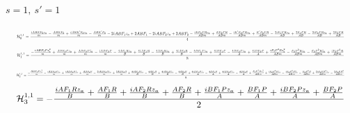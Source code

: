 \documentclass[10pt]{article}
\begin{document}
\paragraph{$s=1,\ s'=1$}
\begin{equation*}
\resizebox{0.98\textwidth}{!}{${\displaystyle \mathcal H^{1,1}_0=\frac{\frac{i A B E F_2 z_a}{m} - \frac{A B E F_2}{m} + \frac{i A B E' F_2 z_a}{m} - \frac{A B E' F_2}{m} - 2 i A B F_1 z_a + 2 A B F_1 - 2 i A B F_2 z_a + 2 A B F_2 - \frac{i E F_2 P R z_a}{A B m} + \frac{E F_2 P R}{A B m} - \frac{i E' F_2 P R z_a}{A B m} + \frac{E' F_2 P R}{A B m} - \frac{2 i F_1 P R z_a}{A B} + \frac{2 F_1 P R}{A B} - \frac{2 i F_2 P R z_a}{A B} + \frac{2 F_2 P R}{A B}}{4}}$}
\end{equation*}
\begin{equation*}
\resizebox{0.98\textwidth}{!}{${\displaystyle \mathcal H^{1,1}_1=\frac{- \frac{i A B F_2 P z_a^{2}}{m} + \frac{A B F_2 P z_a}{m} + \frac{A B F_2 P \bar z_a}{m} - \frac{i A B F_2 P}{m} - \frac{4 A F_1 R z_a}{B} + \frac{4 i A F_1 R}{B} - \frac{4 A F_2 R z_a}{B} + \frac{4 i A F_2 R}{B} - \frac{4 B F_1 P z_a}{A} + \frac{4 i B F_1 P}{A} - \frac{4 B F_2 P z_a}{A} + \frac{4 i B F_2 P}{A} + \frac{i F_2 P^{2} R z_a^{2}}{A B m} - \frac{F_2 P^{2} R z_a}{A B m} - \frac{F_2 P^{2} R \bar z_a}{A B m} + \frac{i F_2 P^{2} R}{A B m}}{8}}$}
\end{equation*}
\begin{equation*}
\resizebox{0.98\textwidth}{!}{${\displaystyle \mathcal H^{1,1}_2=\frac{- \frac{A B F_2 P z_a^{2}}{m} - \frac{i A B F_2 P z_a}{m} + \frac{i A B F_2 P \bar z_a}{m} + \frac{A B F_2 P}{m} - \frac{2 i A B F_2 R z_a}{m} + \frac{2 A B F_2 R}{m} + \frac{4 i A F_1 R z_a}{B} - \frac{4 A F_1 R}{B} + \frac{4 i A F_2 R z_a}{B} - \frac{4 A F_2 R}{B} + \frac{4 i B F_1 P z_a}{A} - \frac{4 B F_1 P}{A} + \frac{4 i B F_2 P z_a}{A} - \frac{4 B F_2 P}{A} + \frac{F_2 P^{2} R z_a^{2}}{A B m} + \frac{i F_2 P^{2} R z_a}{A B m} - \frac{i F_2 P^{2} R \bar z_a}{A B m} - \frac{F_2 P^{2} R}{A B m} + \frac{2 i F_2 P R^{2} z_a}{A B m} - \frac{2 F_2 P R^{2}}{A B m}}{8}}$}
\end{equation*}
\begin{equation*}
\resizebox{0.98\textwidth}{!}{${\displaystyle \mathcal H^{1,1}_3=- \frac{\frac{i A F_1 R z_a}{B} + \frac{A F_1 R}{B} + \frac{i A F_2 R z_a}{B} + \frac{A F_2 R}{B} + \frac{i B F_1 P z_a}{A} + \frac{B F_1 P}{A} + \frac{i B F_2 P z_a}{A} + \frac{B F_2 P}{A}}{2}}$}
\end{equation*}
\normalsize
\end{document}
